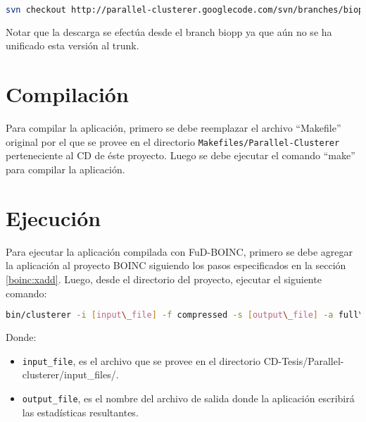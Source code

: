 \documentclass[12pt,spanish,a4paper]{report}
\begin{document}
\begin{lstlisting}[frame=shadowbox, language=bash, basicstyle=\footnotesize, breaklines=true, backgroundcolor=\color{gris}]
svn checkout http://parallel-clusterer.googlecode.com/svn/branches/biopp parallel-clusterer
\end{lstlisting}

Notar que la descarga se efectúa desde el branch biopp ya que aún no se ha unificado esta versión al trunk.


\section{Compilación}

Para compilar la aplicación, primero se debe reemplazar el archivo ``Makefile'' original por el que se provee en el directorio \texttt{Makefiles/Parallel-Clusterer} perteneciente al CD de éste proyecto. Luego se debe ejecutar el comando ``make'' para compilar la aplicación.

\section{Ejecución}

Para ejecutar la aplicación compilada con FuD-BOINC, primero se debe agregar la aplicación al proyecto BOINC siguiendo los pasos especificados en la sección \ref{boinc:xadd}. Luego, desde el directorio del proyecto, ejecutar el siguiente comando:

\begin{lstlisting}[frame=shadowbox, language=bash, basicstyle=\footnotesize, backgroundcolor=\color{gris}]
bin/clusterer -i [input\_file] -f compressed -s [output\_file] -a full\_cache. 
\end{lstlisting}

Donde:

\begin{itemize}
\item \texttt{input\_file}, es el archivo que se provee en el directorio CD-Tesis/Parallel-clusterer/input\_files/.\\
\item \texttt{output\_file}, es el nombre del archivo de salida donde la aplicación escribirá las estadísticas resultantes.
\end{itemize}
\end{document}
